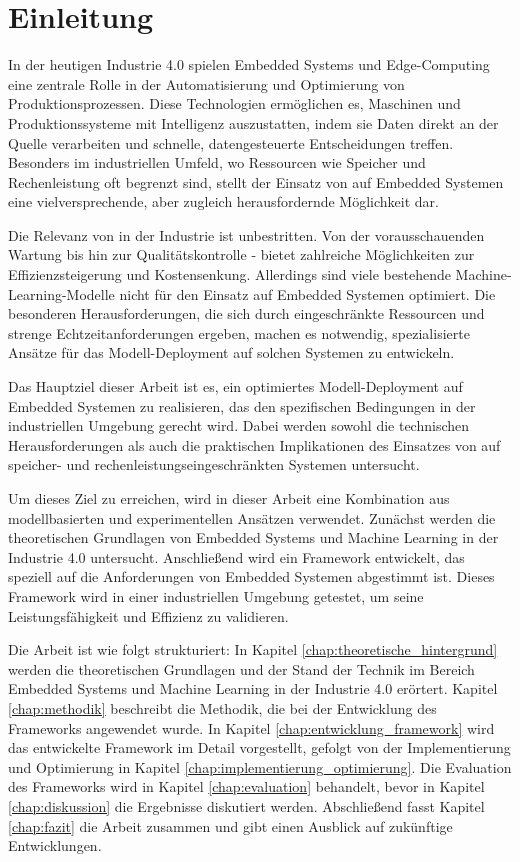 \chapter{Einleitung}
\label{chap:einleitung}


In der heutigen Industrie 4.0 spielen Embedded Systems und Edge-Computing eine zentrale Rolle in der Automatisierung und Optimierung von Produktionsprozessen.
Diese Technologien ermöglichen es, Maschinen und Produktionssysteme mit Intelligenz auszustatten, indem sie Daten direkt an der Quelle verarbeiten und schnelle,
datengesteuerte Entscheidungen treffen. Besonders im industriellen Umfeld, wo Ressourcen wie Speicher und Rechenleistung oft begrenzt sind, stellt der Einsatz von \ML 
auf Embedded Systemen eine vielversprechende, aber zugleich herausfordernde Möglichkeit dar.

Die Relevanz von \ML in der Industrie ist unbestritten. 
Von der vorausschauenden Wartung bis hin zur Qualitätskontrolle - \ML bietet zahlreiche Möglichkeiten zur Effizienzsteigerung und Kostensenkung. 
Allerdings sind viele bestehende Machine-Learning-Modelle nicht für den Einsatz auf Embedded Systemen optimiert. 
Die besonderen Herausforderungen, die sich durch eingeschränkte Ressourcen und strenge Echtzeitanforderungen ergeben, machen es notwendig, 
spezialisierte Ansätze für das Modell-Deployment auf solchen Systemen zu entwickeln.

Das Hauptziel dieser Arbeit ist es, ein optimiertes Modell-Deployment auf Embedded Systemen zu realisieren, das den spezifischen Bedingungen in der industriellen Umgebung gerecht wird. 
Dabei werden sowohl die technischen Herausforderungen als auch die praktischen Implikationen des Einsatzes von \ML auf speicher- und rechenleistungseingeschränkten Systemen untersucht.

Um dieses Ziel zu erreichen, wird in dieser Arbeit eine Kombination aus modellbasierten und experimentellen Ansätzen verwendet. 
Zunächst werden die theoretischen Grundlagen von Embedded Systems und Machine Learning in der Industrie 4.0 untersucht. 
Anschließend wird ein Framework entwickelt, das speziell auf die Anforderungen von Embedded Systemen abgestimmt ist. 
Dieses Framework wird in einer industriellen Umgebung getestet, um seine Leistungsfähigkeit und Effizienz zu validieren.

Die Arbeit ist wie folgt strukturiert: In Kapitel \ref{chap:theoretische_hintergrund} werden die theoretischen Grundlagen und der Stand der Technik im Bereich Embedded Systems und Machine Learning in der Industrie 4.0 erörtert. 
Kapitel \ref{chap:methodik} beschreibt die Methodik, die bei der Entwicklung des Frameworks angewendet wurde. 
In Kapitel \ref{chap:entwicklung_framework} wird das entwickelte Framework im Detail vorgestellt, gefolgt von der Implementierung und Optimierung in Kapitel \ref{chap:implementierung_optimierung}. 
Die Evaluation des Frameworks wird in Kapitel \ref{chap:evaluation} behandelt, bevor in Kapitel \ref{chap:diskussion} die Ergebnisse diskutiert werden. 
Abschließend fasst Kapitel \ref{chap:fazit} die Arbeit zusammen und gibt einen Ausblick auf zukünftige Entwicklungen.

